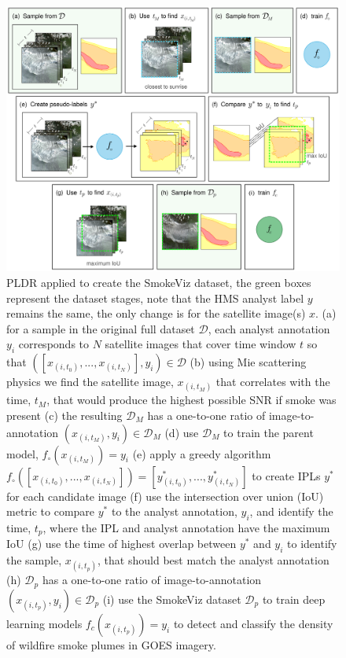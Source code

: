 \documentclass{article}
\begin{document}
\begin{figure}[!htb]
    \centering
    \includegraphics[width=\linewidth]{figures/workflow_small.png}
    \caption{PLDR applied to create the SmokeViz dataset, the green boxes represent the dataset stages, note that the HMS analyst label \(y\) remains the same, the only change is for the satellite image(s) \(x\). (a) for a sample in the original full dataset \(\mathcal{D}\), each analyst annotation \(y_i\) corresponds to \(N\) satellite images that cover time window \(t\) so that \(([x_{(i,t_0)},...,x_{(i,t_N)}], y_i) \in \mathcal{D}\) (b) using Mie scattering physics we find the satellite image, \(x_{(i,t_M)}\) that correlates with the time, \(t_M\), that would produce the highest possible SNR if smoke was present (c) the resulting \(\mathcal{D}_M\) has a one-to-one ratio of image-to-annotation \((x_{(i,t_M)}, y_i) \in \mathcal{D}_M\) (d) use \(\mathcal{D}_M\) to train the parent model, \(f_\circ(x_{(i,t_M)})=y_i\) (e) apply a greedy algorithm \(f_\circ([x_{(i,t_0)},...,x_{(i,t_N)}])=[y^*_{(i,t_0)},...,y^*_{(i,t_N)}]\) to create IPLs \(y^*\) for each candidate image (f) use the intersection over union (IoU) metric to compare \(y^*\) to the analyst annotation, \(y_i\), and identify the time, \(t_p\), where the IPL and analyst annotation have the maximum IoU (g) use the time of highest overlap between \(y^*\) and \(y_i\) to identify the sample, \(x_{(i,t_p)}\), that should best match the analyst annotation (h) \(\mathcal{D}_p\) has a one-to-one ratio of image-to-annotation \((x_{(i,t_p)}, y_i) \in \mathcal{D}_p\) (i) use the SmokeViz dataset \(\mathcal{D}_p\) to train deep learning models \(f_c(x_{(i,t_p)})=y_i\) to detect and classify the density of wildfire smoke plumes in GOES imagery.}\label{PLDR}
\end{figure}
\end{document}
